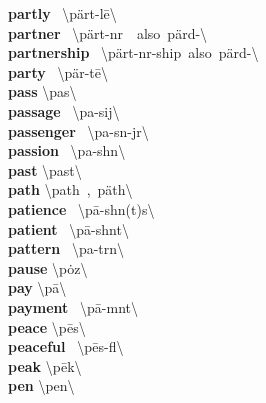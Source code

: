 \documentclass[10pt,a4paper]{article}
\begin{document}
\begin{multicols}{2}
\textbf{ partly }\quad \ \textbackslash \textprimstress p\"{a}rt-l\={e}\textbackslash \\
\textbf{ partner }\quad \ \textbackslash \textprimstress p\"{a}rt-n\textschwa r\ \ also\ \textprimstress p\"{a}rd-\textbackslash \\
\textbf{ partnership }\quad \ \textbackslash \textprimstress p\"{a}rt-n\textschwa r-\textsecstress ship\ also\ \textprimstress p\"{a}rd-\textbackslash \\
\textbf{ party }\quad \ \textbackslash \textprimstress p\"{a}r-t\={e}\textbackslash \\
\textbf{ pass }\quad \textbackslash \textprimstress pas\textbackslash \\
\textbf{ passage }\quad \ \textbackslash \textprimstress pa-sij\textbackslash \\
\textbf{ passenger }\quad \ \textbackslash \textprimstress pa-s\textsuperscript{\textreve}n-j\textschwa r\textbackslash \\
\textbf{ passion }\quad \ \textbackslash \textprimstress pa-sh\textschwa n\textbackslash \\
\textbf{ past }\quad \textbackslash \textprimstress past\textbackslash \\
\textbf{ path }\quad \textbackslash \textprimstress path\ ,\ \textprimstress p\"{a}th\textbackslash \\
\textbf{ patience }\quad \ \textbackslash \textprimstress p\={a}-sh\textschwa n(t)s\textbackslash \\
\textbf{ patient }\quad \ \textbackslash \textprimstress p\={a}-sh\textschwa nt\textbackslash \\
\textbf{ pattern }\quad \ \textbackslash \textprimstress pa-t\textschwa rn\textbackslash \\
\textbf{ pause }\quad \textbackslash \textprimstress p\.{o}z\textbackslash \\
\textbf{ pay }\quad \textbackslash \textprimstress p\={a}\textbackslash \\
\textbf{ payment }\quad \ \textbackslash \textprimstress p\={a}-m\textschwa nt\textbackslash \\
\textbf{ peace }\quad \textbackslash \textprimstress p\={e}s\textbackslash \\
\textbf{ peaceful }\quad \ \textbackslash \textprimstress p\={e}s-f\textschwa l\textbackslash \\
\textbf{ peak }\quad \textbackslash \textprimstress p\={e}k\textbackslash \\
\textbf{ pen }\quad \textbackslash \textprimstress pen\textbackslash \\

\end{multicols}
\end{document}
